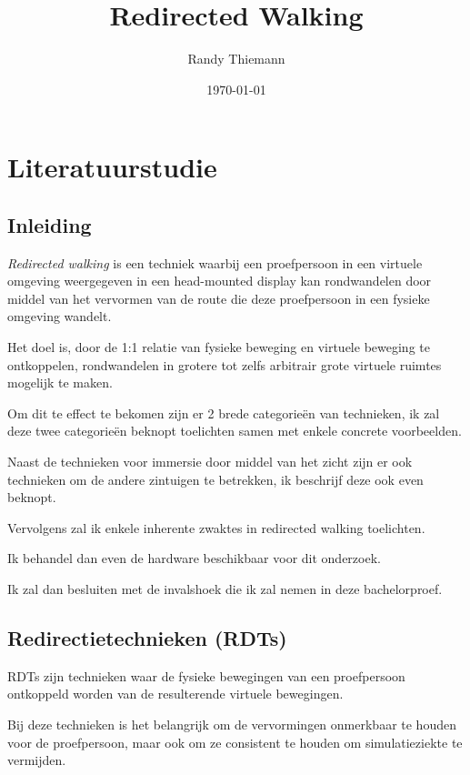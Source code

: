 \documentclass[a4paper,12pt]{article}
\begin{document}
\author{Randy Thiemann} 
\title{Redirected Walking} 
\date{\today} 
\maketitle

\section{Literatuurstudie}
\subsection{Inleiding}
\emph{Redirected walking} is een techniek waarbij een proefpersoon in een 
virtuele omgeving weergegeven in een head-mounted display kan rondwandelen door 
middel van het vervormen van de route die deze proefpersoon in een fysieke 
omgeving wandelt.

Het doel is, door de 1:1 relatie van fysieke beweging en virtuele beweging te
ontkoppelen, rondwandelen in grotere tot zelfs arbitrair grote virtuele ruimtes
mogelijk te maken.

Om dit te effect te bekomen zijn er 2 brede categorie\"en van technieken, ik zal
deze twee categorie\"en beknopt toelichten samen met enkele concrete voorbeelden.

Naast de technieken voor immersie door middel van het zicht zijn er ook 
technieken om de andere zintuigen te betrekken, ik beschrijf deze ook even 
beknopt.

Vervolgens zal ik enkele inherente zwaktes in redirected walking toelichten.

Ik behandel dan even de hardware beschikbaar voor dit onderzoek.

Ik zal dan besluiten met de invalshoek die ik zal nemen in deze bachelorproef.


\subsection{Redirectietechnieken (RDTs)}
RDTs zijn technieken waar de fysieke bewegingen van een proefpersoon ontkoppeld
worden van de resulterende virtuele bewegingen.

Bij deze technieken is het belangrijk om de vervormingen onmerkbaar te houden
voor de proefpersoon\cite{kohn01}, maar ook om ze consistent te houden om 
simulatieziekte te vermijden\cite{kolasinski95}.
\end{document}
